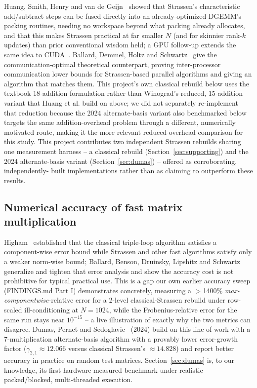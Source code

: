 \documentclass[acmsmall]{acmart}
\begin{document}
Huang, Smith, Henry and van de Geijn~\cite{huang2016strassen} showed that
Strassen's characteristic add/subtract steps can be fused directly into
an already-optimized DGEMM's packing routines, needing no workspace
beyond what packing already allocates, and that this makes Strassen
practical at far smaller $N$ (and for skinnier rank-$k$ updates) than
prior conventional wisdom held; a GPU follow-up extends the same idea to
CUDA~\cite{huang2020strassengpu}. Ballard, Demmel, Holtz and
Schwartz~\cite{ballard2012communication} give the communication-optimal
theoretical counterpart, proving inter-processor communication lower
bounds for Strassen-based parallel algorithms and giving an algorithm
that matches them. This project's own classical rebuild below uses the
textbook 18-addition formulation rather than Winograd's reduced,
15-addition variant that Huang et al. build on above; we did not
separately re-implement that reduction because the 2024 alternate-basis
variant also benchmarked below targets the same addition-overhead
problem through a different, numerically motivated route, making it
the more relevant reduced-overhead comparison for this study. This
project contributes two independent Strassen rebuilds sharing one
measurement harness -- a classical rebuild
(Section~\ref{sec:supporting}) and the 2024 alternate-basis variant
(Section~\ref{sec:dumas}) -- offered as corroborating, independently-
built implementations rather than as claiming to outperform these
results.

\subsection{Numerical accuracy of fast matrix multiplication}
Higham~\cite{higham1990exploiting} established that the classical
triple-loop algorithm satisfies a component-wise error bound while
Strassen and other fast algorithms satisfy only a weaker norm-wise
bound; Ballard, Benson, Druinsky, Lipshitz and
Schwartz~\cite{ballard2016improving} generalize and tighten that error
analysis and show the accuracy cost is not prohibitive for typical
practical use. This is a gap our own earlier accuracy sweep
(FINDINGS.md Part I) demonstrates concretely, measuring a $>$1400\%
\emph{max-componentwise}-relative error for a 2-level classical-Strassen
rebuild under row-scaled ill-conditioning at $N{=}1024$, while the
Frobenius-relative error for the same run stays near $10^{-15}$ -- a
live illustration of exactly why the two metrics can disagree. Dumas,
Pernet and Sedoglavic~\cite{dumas2024strassen} (2024) build on this
line of work with a 7-multiplication alternate-basis algorithm with a
provably lower error-growth factor ($\gamma_{2,1}\approx12.066$ versus
classical Strassen's $\approx14.828$) and report better accuracy in
practice on random test matrices. Section~\ref{sec:dumas} is, to our
knowledge, its first hardware-measured benchmark under realistic
packed/blocked, multi-threaded execution.
\end{document}
